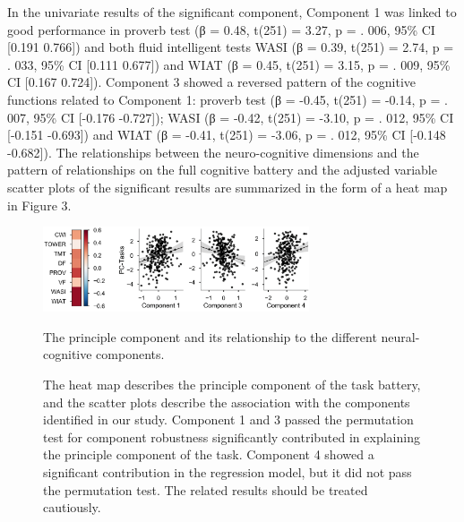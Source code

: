 In the univariate results of the significant component, Component 1 was linked to good performance in proverb test (β = 0.48, t(251) = 3.27, p = . 006, 95\% CI [0.191  0.766]) and both fluid intelligent tests WASI (β = 0.39, t(251) = 2.74, p = . 033, 95\% CI [0.111 0.677]) and WIAT (β = 0.45, t(251) = 3.15, p = . 009, 95\% CI [0.167 0.724]). Component 3 showed a reversed pattern of the cognitive functions related to Component 1: proverb test (β = -0.45, t(251) = -0.14, p = . 007, 95\% CI [-0.176 -0.727]); WASI (β = -0.42, t(251) = -3.10, p = . 012, 95\% CI [-0.151 -0.693]) and WIAT (β = -0.41, t(251) = -3.06, p = . 012, 95\% CI [-0.148 -0.682]). The relationships between the neuro-cognitive dimensions and the pattern of relationships on the full cognitive battery and the adjusted variable scatter plots of the significant results are summarized in the form of a heat map in Figure 3.
\begin{figure}[H]
    \centering
    \includegraphics[width=0.7\textwidth]{chapters/img/study2fig4.png}
    \caption{The principle component and its relationship to the different neural-cognitive components.} 
    \caption*{
    \scriptsize{The heat map describes the principle component of the task battery, and the scatter plots describe the association with the components identified in our study. Component 1 and 3 passed the permutation test for component robustness significantly contributed in explaining the principle component of the task. Component 4 showed a significant contribution in the regression model, but it did not pass the permutation test. The related results should be treated cautiously.}
    }
    \label{fig:study2:fig4}
\end{figure}
